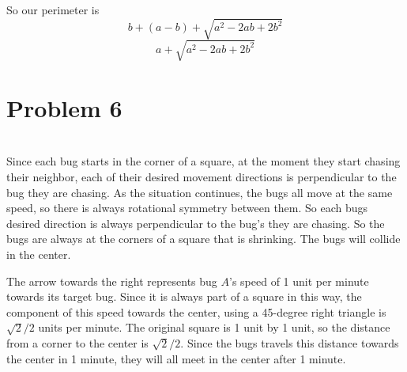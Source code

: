 \documentclass[12pt]{article}
\begin{document}
So our perimeter is
\[b + (a-b) + \sqrt{a^2 - 2ab + 2b^2}\]
\[a + \sqrt{a^2 - 2ab + 2b^2}\]


\newpage
\section*{Problem 6}
\\
Since each bug starts in the corner of a square, at the moment they start chasing their neighbor, each of their desired movement directions is perpendicular to the bug they are chasing. As the situation continues, the bugs all move at the same speed, so there is always rotational symmetry between them. So each bugs desired direction is always perpendicular to the bug's they are chasing. So the bugs are always at the corners of a square that is shrinking. The bugs will collide in the center.

\begin{center}
\end{center}

The arrow towards the right represents bug $A$'s speed of 1 unit per minute towards its target bug. Since it is always part of a square in this way, the component of this speed towards the center, using a 45-degree right triangle is $\sqrt{2}/2$ units per minute. The original square is 1 unit by 1 unit, so the distance from a corner to the center is $\sqrt{2}/2$. Since the bugs travels this distance towards the center in 1 minute, they will all meet in the center after 1 minute.
\end{document}

